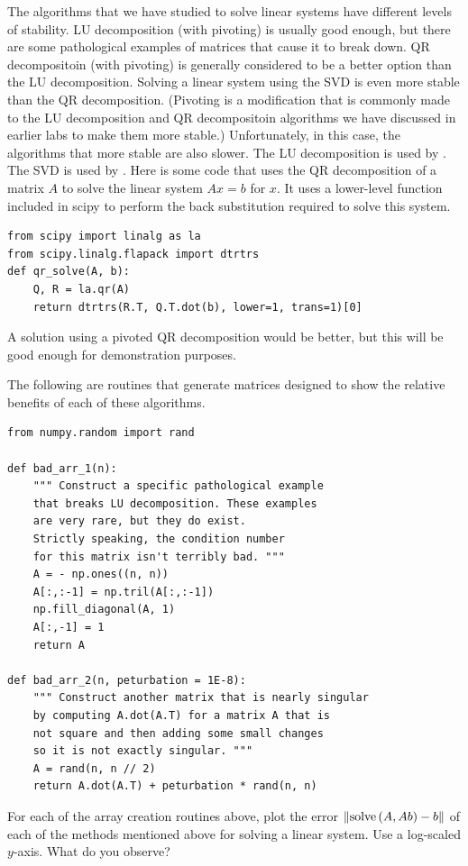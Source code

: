 The algorithms that we have studied to solve linear systems have different levels of stability.
LU decomposition (with pivoting) is usually good enough, but there are some pathological examples of matrices that cause it to break down.
QR decompositoin (with pivoting) is generally considered to be a better option than the LU decomposition.
Solving a linear system using the SVD is even more stable than the QR decomposition.
(Pivoting is a modification that is commonly made to the LU decomposition and QR decompositoin algorithms we have discussed in earlier labs to make them more stable.)
Unfortunately, in this case, the algorithms that more stable are also slower.
The LU decomposition is used by .
The SVD is used by .
Here is some code that uses the QR decomposition of a matrix $A$ to solve the linear system $A x = b$ for $x$.
It uses a lower-level function included in scipy to perform the back substitution required to solve this system.
\begin{lstlisting}
from scipy import linalg as la
from scipy.linalg.flapack import dtrtrs
def qr_solve(A, b):
    Q, R = la.qr(A)
    return dtrtrs(R.T, Q.T.dot(b), lower=1, trans=1)[0]
\end{lstlisting}
A solution using a pivoted QR decomposition would be better, but this will be good enough for demonstration purposes.

The following are routines that generate matrices designed to show the relative benefits of each of these algorithms.
\begin{lstlisting}
from numpy.random import rand

def bad_arr_1(n):
    """ Construct a specific pathological example
    that breaks LU decomposition. These examples
    are very rare, but they do exist.
    Strictly speaking, the condition number
    for this matrix isn't terribly bad. """
    A = - np.ones((n, n))
    A[:,:-1] = np.tril(A[:,:-1])
    np.fill_diagonal(A, 1)
    A[:,-1] = 1
    return A

def bad_arr_2(n, peturbation = 1E-8):
    """ Construct another matrix that is nearly singular
    by computing A.dot(A.T) for a matrix A that is
    not square and then adding some small changes
    so it is not exactly singular. """
    A = rand(n, n // 2)
    return A.dot(A.T) + peturbation * rand(n, n)
\end{lstlisting}

\begin{problem}
For each of the array creation routines above, plot the error $\left\lVert\text{solve}\left(A, A b\right) - b\right\rVert$ of each of the methods mentioned above for solving a linear system.
Use a log-scaled $y$-axis.
What do you observe?
\end{problem}

